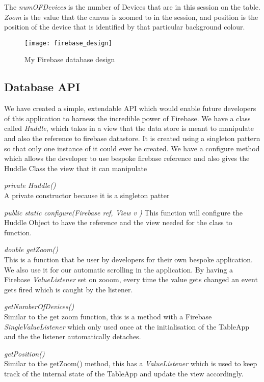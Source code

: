 The \emph{numOFDevices} is the number of Devices that are in this session on the table. \emph{Zoom} is the value that the canvas is zoomed to in the session, and position is the position of the device that is identified by that particular background colour.

\begin{figure}[H]
\centering
\texttt{[image: firebase\_design]}
\caption{My Firebase database design}
\label{firebase_design}
\end{figure}

\subsection{Database API} 

We have created a simple, extendable API which would enable future developers of this application to harness the incredible power of Firebase. We have a class called \emph{Huddle}, which takes in a view that the data store is meant to manipulate and also the reference to firebase datastore. It is created using a singleton pattern so that only one instance of it could ever be created. We have a configure method which allows the developer to use bespoke firebase reference and also gives the Huddle Class the view that it can manipulate

\emph{private Huddle()}\\
A private constructor because it is a singleton patter

\emph{public static configure(Firebase ref, View v )}
This function will configure the Huddle Object to have the reference and the view needed for the class to function.

\emph{double getZoom()}\\
This is a function that be user by developers for their own bespoke application. We also use it for our automatic scrolling in the application. By having a Firebase \emph{ValueListener} set on zooom, every time the value gets changed an event gets fired which is caught by the listener.

\emph{getNumberOfDevices()}\\
Similar to the get zoom function, this is a method with a Firebase \emph{SingleValueListener} which only used once at the initialisation of the TableApp and the the listener automatically detaches.

\emph{getPosition()}\\
Similar to the getZoom() method, this has a  \emph{ValueListener} which is used to keep track of the internal state of the TableApp and update the view accordingly.

